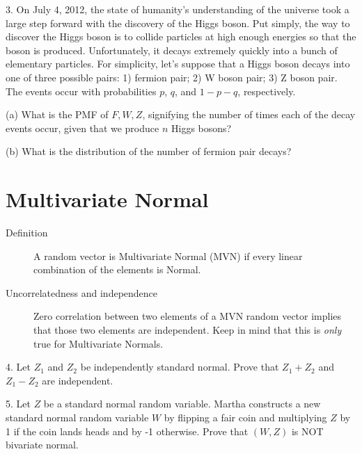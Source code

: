 \documentclass{article}
\begin{document}
3. On July 4, 2012, the state of humanity's understanding of the universe took a large step forward with the discovery of the Higgs boson. Put simply, the way to discover the Higgs boson is to collide particles at high enough energies so that the boson is produced. Unfortunately, it decays extremely quickly into a bunch of elementary particles. For simplicity, let's suppose that a Higgs boson decays into one of three possible pairs: 1) fermion pair; 2) W boson pair; 3) Z boson pair. The events occur with probabilities $p$, $q$, and $1-p-q$, respectively. 

(a) What is the PMF of $F, W, Z$, signifying the number of times each of the decay events occur, given that we produce $n$ Higgs bosons?


(b) What is the distribution of the number of fermion pair decays?


\section{Multivariate Normal}

\begin{description}

\item[Definition] A random vector is Multivariate Normal (MVN) if every linear combination of the elements is Normal.

\item[Uncorrelatedness and independence] Zero correlation between two elements of a MVN random vector implies that those two elements are independent. Keep in mind that this is \textit{only} true for Multivariate Normals.

\end{description}

4. Let $Z_1$ and $Z_2$ be independently standard normal. Prove that $Z_1+Z_2$ and $Z_1-Z_2$ are independent.


5. Let $Z$ be a standard normal random variable. Martha constructs a new standard normal random variable $W$ by flipping a fair coin and multiplying $Z$ by 1 if the coin lands heads and by -1 otherwise. Prove that $(W,Z)$ is NOT bivariate normal.

\end{document}
